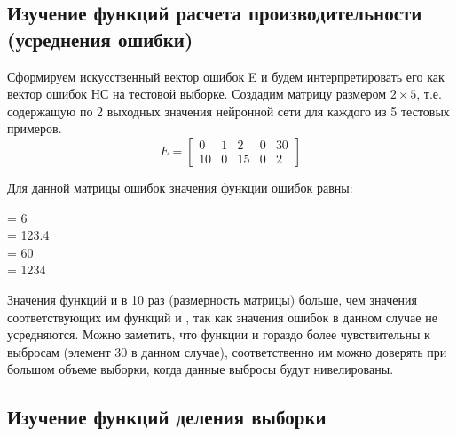 \subsection{Изучение функций расчета производительности (усреднения ошибки)}


Сформируем искусственный вектор ошибок E и будем интерпретировать его как вектор ошибок НС на тестовой выборке. Создадим матрицу размером $2 \times 5$, т.е. содержащую по 2 выходных значения нейронной сети для каждого из 5 тестовых примеров.
\begin{equation*}
E = \begin{bmatrix}
	0 & 1 & 2 & 0 & 30 \\
	10 & 0 & 15 & 0 & 2
\end{bmatrix}
\end{equation*}

Для данной матрицы ошибок значения функции ошибок равны:
\begin{multicols}{4}
	\centering
	 = 6 \\
	 = 123.4 \\
	 = 60 \\
	 = 1234
\end{multicols}

Значения функций  и  в 10 раз (размерность матрицы) больше, чем значения соответствующих им функций  и , так как значения ошибок в данном случае не усредняются. Можно заметить, что функции  и  гораздо более чувствительны к выбросам (элемент 30 в данном случае), соответственно им можно доверять при большом объеме выборки, когда данные выбросы будут нивелированы.

\subsection{Изучение функций деления выборки}


